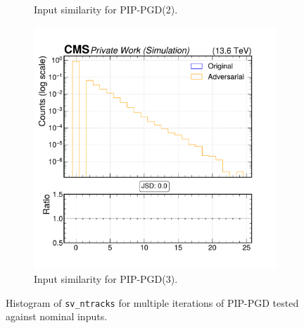 \begin{figure}[htbp]
\begin{subfigure}[t]{0.32\textwidth}
    \caption*{Input similarity for PIP-PGD(2).}
  \end{subfigure}\hfill
  \begin{subfigure}[t]{0.32\textwidth}
    \includegraphics[width=\linewidth]{media/output/features/compare/combined_it_3/cmp_vtx_arr_sv_ntracks.pdf}
    \caption*{Input similarity for PIP-PGD(3).}
  \end{subfigure}

  \caption*{Histogram of \texttt{sv\_ntracks} for multiple iterations of PIP-PGD tested against nominal inputs.}
  \label{fig:combined_input_sv_ntracks}
\end{figure}

